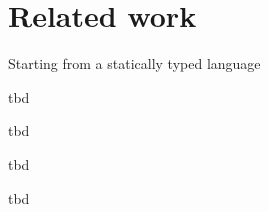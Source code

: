 \section{Related work}


Starting from a statically typed language



tbd



tbd



tbd



tbd
\newcommand{\DS}{\begin{sideways}DuctileScala\end{sideways}}
\newcommand{\hask}{\begin{sideways}Haskell\end{sideways}}
\newcommand{\dyn}{\begin{sideways}Dynamic\end{sideways}}
\newcommand{\SV}{\begin{sideways}Scala-Virtualized\end{sideways}}
\newcommand{\dart}{\begin{sideways}Dart\end{sideways}}
\newcommand{\DL}{\begin{sideways}dynamic languages\end{sideways}}
\newcommand{\SJS}{\begin{sideways}Scala-JS interoperatability\end{sideways}}
\newcommand{\JSLMS}{\begin{sideways}JS on LMS\end{sideways}}
\newcommand{\SD}{\begin{sideways}ScalaDyno\end{sideways}}

